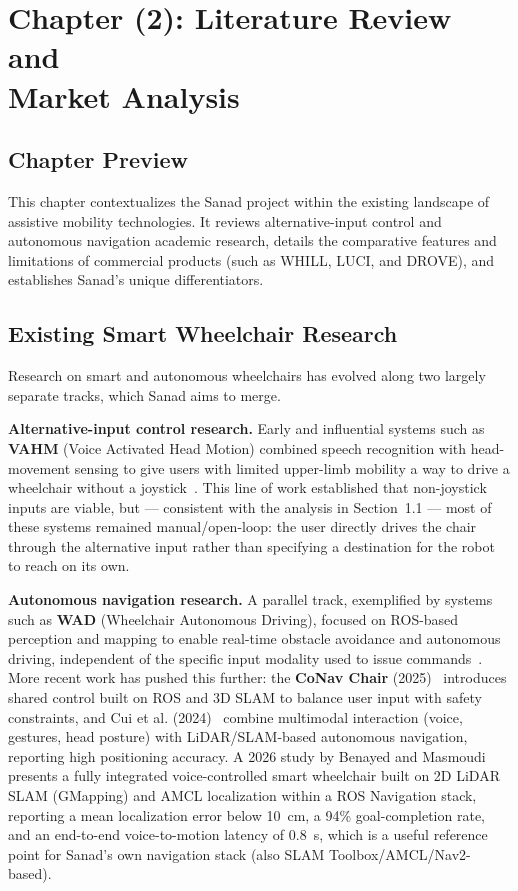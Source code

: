 \setcounter{chapter}{2}
\chapter*{Chapter (2): Literature Review and \\ Market Analysis}
\setcounter{section}{0}

\section{Chapter Preview}
This chapter contextualizes the Sanad project within the existing landscape of assistive mobility technologies. It reviews alternative-input control and autonomous navigation academic research, details the comparative features and limitations of commercial products (such as WHILL, LUCI, and DROVE), and establishes Sanad's unique differentiators.

\section{Existing Smart Wheelchair Research}

Research on smart and autonomous wheelchairs has evolved along two largely separate tracks, which Sanad aims to merge.

\textbf{Alternative-input control research.} Early and influential systems such as \textbf{VAHM} (Voice Activated Head Motion) combined speech recognition with head-movement sensing to give users with limited upper-limb mobility a way to drive a wheelchair without a joystick~\cite{benayed2026voicecontrolled}. This line of work established that non-joystick inputs are viable, but --- consistent with the analysis in Section~1.1 --- most of these systems remained manual/open-loop: the user directly drives the chair through the alternative input rather than specifying a destination for the robot to reach on its own.

\textbf{Autonomous navigation research.} A parallel track, exemplified by systems such as \textbf{WAD} (Wheelchair Autonomous Driving), focused on ROS-based perception and mapping to enable real-time obstacle avoidance and autonomous driving, independent of the specific input modality used to issue commands~\cite{benayed2026voicecontrolled}. More recent work has pushed this further: the \textbf{CoNav Chair} (2025)~\cite{conavchair2025arxiv} introduces shared control built on ROS and 3D SLAM to balance user input with safety constraints, and Cui et al. (2024)~\cite{cui2024intelligent} combine multimodal interaction (voice, gestures, head posture) with LiDAR/SLAM-based autonomous navigation, reporting high positioning accuracy. A 2026 study by Benayed and Masmoudi~\cite{benayed2026voicecontrolled} presents a fully integrated voice-controlled smart wheelchair built on 2D LiDAR SLAM (GMapping) and AMCL localization within a ROS Navigation stack, reporting a mean localization error below 10~cm, a 94\% goal-completion rate, and an end-to-end voice-to-motion latency of 0.8~s, which is a useful reference point for Sanad's own navigation stack (also SLAM Toolbox/AMCL/Nav2-based).

